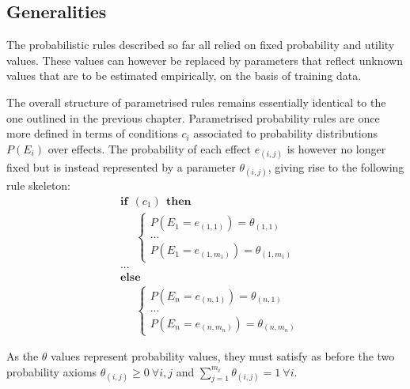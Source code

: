 \subsection{Generalities}

The probabilistic rules described so far all relied on fixed probability and utility values. These values can however be replaced by parameters that reflect unknown values that are to be estimated empirically, on the basis of training data. 
 
The overall structure of parametrised rules remains essentially identical to the one outlined in the previous chapter.  Parametrised probability rules are once more defined in terms of conditions $c_i$ associated to probability distributions $P(E_i)$ over effects.  The probability of each effect $e_{(i,j)}$ is however no longer fixed but is instead represented by a parameter $\theta_{(i,j)}$, giving rise to the following rule skeleton: 
\begin{equation}
\begin{aligned}
& \textbf{if} \ \ (c_{1}) \ \ \textbf{then} \\ 
& \;\;\;\;\; \begin{cases}
P(E_1\!=\!e_{(1,1)}) = \theta_{(1,1)} \\
 ... \\
P(E_1\!=\!e_{(1,m_1)}) = \theta_{(1,m_1)} 
\end{cases} \\[3mm]
& ...  \\
& \textbf{else} \\
& \;\;\;\;\; \begin{cases}
P(E_{n}\!=\!e_{(n,1)}) = \theta_{(n,1)} \\
... \\
P(E_{n}\!=\!e_{(n,m_n)}) = \theta_{(n,m_n)}
\end{cases}
\end{aligned}
\label{eq:probrule}
\end{equation}

As the $\theta$ values represent probability values, they must satisfy as before the two probability axioms $\theta_{(i,j)} \geq 0  \ \forall i,j$ and $\sum_{j = 1}^{m_i} \theta_{(i,j)} = 1 \ \forall i$.

